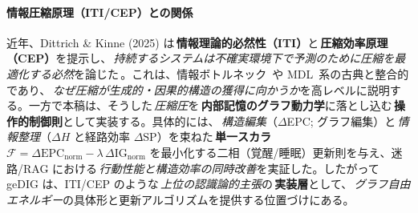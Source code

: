 \documentclass[ja=standard,xelatex]{bxjsarticle}
\newcommand{\F}{\mathcal{F}}
\newcommand{\gednorm}{\Delta\mathrm{EPC}_{\mathrm{norm}}}
\newcommand{\ignorm}{\Delta\mathrm{IG}_{\mathrm{norm}}}
\begin{document}
\paragraph{情報圧縮原理（ITI/CEP）との関係} 近年、Dittrich \& Kinne (2025) は\,\textbf{情報理論的必然性（ITI）}と\,\textbf{圧縮効率原理（CEP）}を提示し、\,\emph{持続するシステムは不確実環境下で予測のために圧縮を最適化する必然}を論じた\,\cite{DittrichKinne2025ITI}。これは、情報ボトルネック\,\cite{Tishby1999} や MDL\,\cite{rissanen1978} 系の古典と整合的であり、\,\emph{なぜ圧縮が生成的・因果的構造の獲得に向かうか}を高レベルに説明する。一方で本稿は、そうした\,\emph{圧縮圧}を\,\textbf{内部記憶のグラフ動力学}に落とし込む\,\textbf{操作的制御則}として実装する。具体的には、\,\emph{構造編集}（$\Delta$EPC; グラフ編集）と\,\emph{情報整理}（$\Delta H$ と経路効率 $\Delta\mathrm{SP}$）を束ねた\,\textbf{単一スカラ} $\F=\gednorm-\lambda\,\ignorm$ を最小化する二相（覚醒/睡眠）更新則を与え、迷路/RAG における\,\emph{行動性能と構造効率の同時改善}を実証した。したがって geDIG は、ITI/CEP のような\,\emph{上位の認識論的主張}の\,\textbf{実装層}として、\,\emph{グラフ自由エネルギー}の具体形と更新アルゴリズムを提供する位置づけにある。
\end{document}
